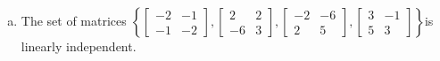 \begin{exerciseAnswer}
\begin{enumerate}[(a)]
\item The set of matrices \( \left\{ \left[\begin{array}{cc}
-2 & -1 \\
-1 & -2
\end{array}\right] , \left[\begin{array}{cc}
2 & 2 \\
-6 & 3
\end{array}\right] , \left[\begin{array}{cc}
-2 & -6 \\
2 & 5
\end{array}\right] , \left[\begin{array}{cc}
3 & -1 \\
5 & 3
\end{array}\right] \right\} \)is linearly independent.
\end{enumerate}
    
\end{exerciseAnswer}
    
